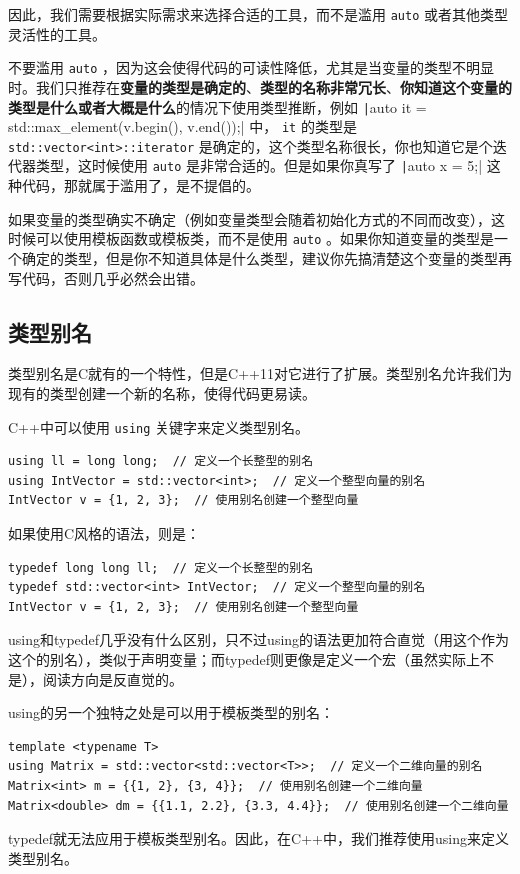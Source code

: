 因此，我们需要根据实际需求来选择合适的工具，而不是滥用 \texttt{auto} 或者其他类型灵活性的工具。

\begin{caution}
  不要滥用 \texttt{auto} ，因为这会使得代码的可读性降低，尤其是当变量的类型不明显时。我们只推荐在\textbf{变量的类型是确定的}、\textbf{类型的名称非常冗长}、\textbf{你知道这个变量的类型是什么或者大概是什么}的情况下使用类型推断，例如 \texttt|auto it = std::max_element(v.begin(), v.end());| 中， \texttt{it} 的类型是 \texttt{std::vector<int>::iterator} 是确定的，这个类型名称很长，你也知道它是个迭代器类型，这时候使用 \texttt{auto} 是非常合适的。但是如果你真写了 \texttt|auto x = 5;| 这种代码，那就属于滥用了，是不提倡的。

  如果变量的类型确实不确定（例如变量类型会随着初始化方式的不同而改变），这时候可以使用模板函数或模板类，而不是使用 \texttt{auto} 。如果你知道变量的类型是一个确定的类型，但是你不知道具体是什么类型，建议你先搞清楚这个变量的类型再写代码，否则几乎必然会出错。
\end{caution}

\subsection{类型别名}

类型别名是C就有的一个特性，但是C++11对它进行了扩展。类型别名允许我们为现有的类型创建一个新的名称，使得代码更易读。

C++中可以使用 \texttt{using} 关键字来定义类型别名。
\begin{verbatim}
using ll = long long;  // 定义一个长整型的别名
using IntVector = std::vector<int>;  // 定义一个整型向量的别名
IntVector v = {1, 2, 3};  // 使用别名创建一个整型向量
\end{verbatim}

如果使用C风格的语法，则是：
\begin{verbatim}
typedef long long ll;  // 定义一个长整型的别名
typedef std::vector<int> IntVector;  // 定义一个整型向量的别名
IntVector v = {1, 2, 3};  // 使用别名创建一个整型向量
\end{verbatim}

using和typedef几乎没有什么区别，只不过using的语法更加符合直觉（用这个作为这个的别名），类似于声明变量；而typedef则更像是定义一个宏（虽然实际上不是），阅读方向是反直觉的。

using的另一个独特之处是可以用于模板类型的别名：
\begin{verbatim}
template <typename T>
using Matrix = std::vector<std::vector<T>>;  // 定义一个二维向量的别名
Matrix<int> m = {{1, 2}, {3, 4}};  // 使用别名创建一个二维向量
Matrix<double> dm = {{1.1, 2.2}, {3.3, 4.4}};  // 使用别名创建一个二维向量
\end{verbatim}
typedef就无法应用于模板类型别名。因此，在C++中，我们推荐使用using来定义类型别名。

